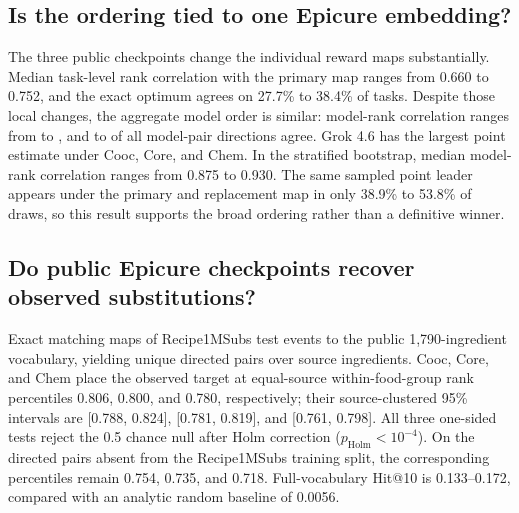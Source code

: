 \documentclass[10pt,twocolumn]{article}
\begin{document}
\subsection{Is the ordering tied to one Epicure embedding?}

The three public checkpoints change the individual reward maps substantially. Median task-level
rank correlation with the primary map ranges from 0.660 to 0.752, and the exact optimum agrees on
27.7\% to 38.4\% of tasks. Despite those local changes, the aggregate model order is similar:
model-rank correlation ranges from \FBPublicScorerMinRho{} to \FBPublicScorerMaxRho{}, and
\FBPublicScorerMinPair{} to \FBPublicScorerMaxPair{} of all model-pair directions agree. Grok 4.6
has the largest point estimate under Cooc, Core, and Chem. In the stratified bootstrap, median
model-rank correlation ranges from 0.875 to 0.930. The same sampled point leader appears under the
primary and replacement map in only 38.9\% to 53.8\% of draws, so this result supports the broad
ordering rather than a definitive winner.

\begin{table}[t]
  \centering
  \scriptsize
  \setlength{\tabcolsep}{3.2pt}
  
  \caption{Post-hoc replacement of the reward map on the fixed 534 tasks and fixed model
  selections. Task-map $\rho$ is the median correlation across each task's 56 portfolios. Model
  rank and pair order compare the aggregate leaderboard with the primary map.}
  \label{tab:public-scorer-sensitivity}
\end{table}

\subsection{Do public Epicure checkpoints recover observed substitutions?}

Exact matching maps \FBExternalSubMappedEvents{} of \FBExternalSubRawTest{} Recipe1MSubs test
events to the public 1,790-ingredient vocabulary, yielding \FBExternalSubPairs{} unique directed
pairs over \FBExternalSubSources{} source ingredients. Cooc, Core, and Chem place the observed
target at equal-source within-food-group rank percentiles 0.806, 0.800, and 0.780, respectively;
their source-clustered 95\% intervals are [0.788, 0.824], [0.781, 0.819], and [0.761, 0.798]. All
three one-sided tests reject the 0.5 chance null after Holm correction
($p_{\mathrm{Holm}}<10^{-4}$). On the \FBExternalSubNovelPairs{} directed pairs absent from the
Recipe1MSubs training split, the corresponding percentiles remain 0.754, 0.735, and 0.718.
Full-vocabulary Hit@10 is 0.133--0.172, compared with an analytic random baseline of 0.0056.
\end{document}
